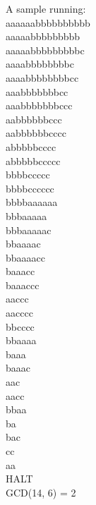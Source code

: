 \documentclass{article}
\begin{document}
 \noindent A sample running:\\
aaaaaabbbbbbbbbb\\
aaaaabbbbbbbbb\\
aaaaabbbbbbbbbc\\
aaaabbbbbbbbc\\
aaaabbbbbbbbcc\\
aaabbbbbbbcc\\
aaabbbbbbbccc\\
aabbbbbbccc\\
aabbbbbbcccc\\
abbbbbcccc\\
abbbbbccccc\\
bbbbccccc\\
bbbbcccccc\\
bbbbaaaaaa\\
bbbaaaaa\\
bbbaaaaac\\
bbaaaac\\
bbaaaacc\\
baaacc\\
baaaccc\\
aaccc\\
aacccc\\
bbcccc\\
bbaaaa\\
baaa\\
baaac\\
aac\\
aacc\\
bbaa\\
ba\\
bac\\
cc\\
aa\\
HALT\\
GCD(14, 6) = 2
\end{document}
